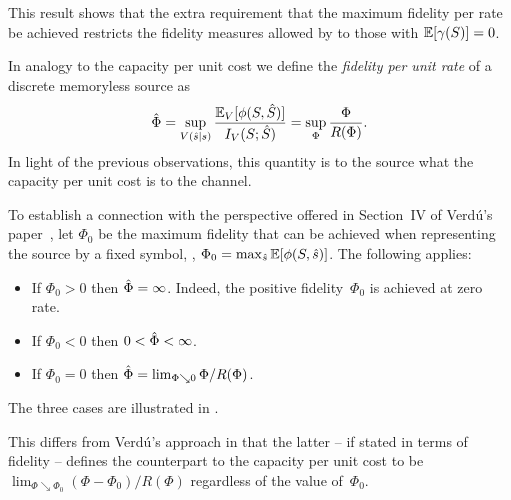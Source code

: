 This result shows that the extra requirement that the maximum fidelity per rate
be achieved restricts the fidelity measures allowed by  to
those with $\mathbb{E}[\gamma(S)] = 0$.



In analogy to the capacity per unit cost we define the \emph{fidelity per unit
rate} of a discrete memoryless source as
\[ {\hat{\Phi}} = \sup_{V({\hat{s}}|s)} \frac{{\mathbb{E}_V}[\phi(S,{\hat{S}})]}{I_V(S;{\hat{S}})} =  \sup_{\Phi}
\frac{\Phi}{R(\Phi)}. \]
In light of the previous observations, this quantity is to the source what the
capacity per unit cost is to the channel. 

\begin{remark}\label{rem:verduphi}
  To establish a connection with the perspective offered in Section~IV of
  Verd\'u's paper~\cite{Verdu1990}, let $\Phi_0$ be the maximum fidelity that
  can be achieved when representing the source by a fixed symbol, \ie, $\Phi_0 =
  \max_{{\hat{s}}} \mathbb{E}[\phi(S, {\hat{s}})]$. The following applies:
\begin{itemize}
  \item If $\Phi_0 > 0$ then ${\hat{\Phi}} = \infty$. Indeed, the positive
    fidelity~$\Phi_0$ is achieved at zero rate.
  \item If $\Phi_0 < 0$ then $0 < {\hat{\Phi}} < \infty$. 
  \item If $\Phi_0 = 0$ then ${\hat{\Phi}} = \lim_{\Phi \searrow 0} \Phi /
    R(\Phi)$. 
\end{itemize}
The three cases are illustrated in .

This differs from Verd\'u's approach in that the latter -- if stated in terms of
fidelity -- defines the counterpart to the capacity per unit cost to be
$\lim_{\Phi \searrow \Phi_0} (\Phi - \Phi_0) / R(\Phi)$ regardless of the value
of~$\Phi_0$. 
\end{remark}

